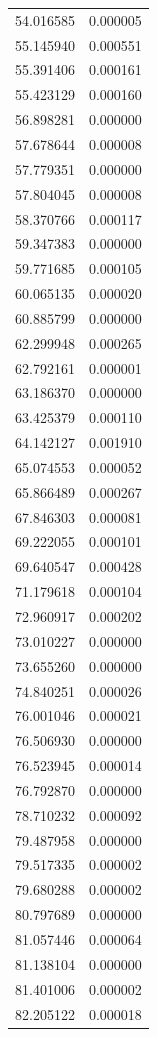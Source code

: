 \begin{longtable}{rr}
54.016585 & 0.000005 \\
55.145940 & 0.000551 \\
55.391406 & 0.000161 \\
55.423129 & 0.000160 \\
56.898281 & 0.000000 \\
57.678644 & 0.000008 \\
57.779351 & 0.000000 \\
57.804045 & 0.000008 \\
58.370766 & 0.000117 \\
59.347383 & 0.000000 \\
59.771685 & 0.000105 \\
60.065135 & 0.000020 \\
60.885799 & 0.000000 \\
62.299948 & 0.000265 \\
62.792161 & 0.000001 \\
63.186370 & 0.000000 \\
63.425379 & 0.000110 \\
64.142127 & 0.001910 \\
65.074553 & 0.000052 \\
65.866489 & 0.000267 \\
67.846303 & 0.000081 \\
69.222055 & 0.000101 \\
69.640547 & 0.000428 \\
71.179618 & 0.000104 \\
72.960917 & 0.000202 \\
73.010227 & 0.000000 \\
73.655260 & 0.000000 \\
74.840251 & 0.000026 \\
76.001046 & 0.000021 \\
76.506930 & 0.000000 \\
76.523945 & 0.000014 \\
76.792870 & 0.000000 \\
78.710232 & 0.000092 \\
79.487958 & 0.000000 \\
79.517335 & 0.000002 \\
79.680288 & 0.000002 \\
80.797689 & 0.000000 \\
81.057446 & 0.000064 \\
81.138104 & 0.000000 \\
81.401006 & 0.000002 \\
82.205122 & 0.000018 \\

\end{longtable}
